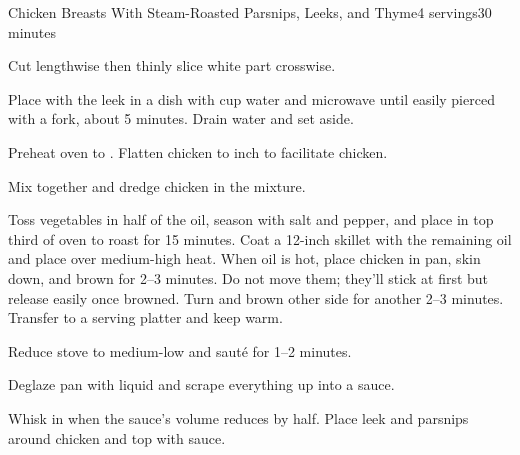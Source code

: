 \documentclass[../Cookbook.tex]{subfiles}
\begin{document}
\begin{recipe}{Chicken Breasts With Steam-Roasted Parsnips, Leeks, and Thyme}{4 servings}{30 minutes}

Cut lengthwise then thinly slice white part crosswise.

Place with the leek in a dish with  cup water and microwave until easily pierced with a fork, about 5 minutes. Drain water and set aside.

Preheat oven to . Flatten chicken to  inch to facilitate chicken.

Mix together and dredge chicken in the mixture.

Toss vegetables in half of the oil, season with salt and pepper, and place in top third of oven to roast for 15 minutes.
Coat a 12-inch skillet with the remaining oil and place over medium-high heat. When oil is hot, place chicken in pan, skin down, and brown for 2--3 minutes. Do not move them; they'll stick at first but release easily once browned. Turn and brown other side for another 2--3 minutes. Transfer to a serving platter and keep warm.

Reduce stove to medium-low and saut\'e for 1--2 minutes.

Deglaze pan with liquid and scrape everything up into a sauce.

Whisk in when the sauce's volume reduces by half. Place leek and parsnips around chicken and top with sauce.

\end{recipe}
\end{document}
